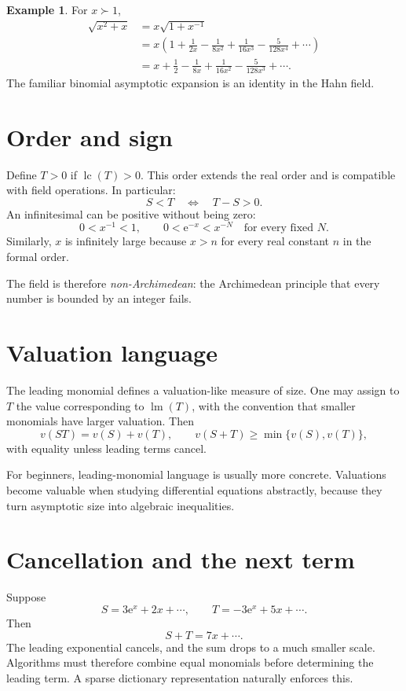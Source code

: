 \documentclass[11pt,openany]{book}
\theoremstyle{definition}
\newtheorem{example}{Example}[chapter]
\theoremstyle{plain}
\theoremstyle{remark}
\newcommand{\e}{\mathrm{e}}
\newcommand{\succdom}{\succ}
\DeclareMathOperator{\lm}{lm}
\DeclareMathOperator{\lc}{lc}
\begin{document}
\begin{example}
For $x\succdom1$,
\begin{align*}
 \sqrt{x^2+x}
 &=x\sqrt{1+x^{-1}}\\
 &=x\left(1+\frac1{2x}-\frac1{8x^2}
 +\frac1{16x^3}-\frac5{128x^4}+\cdots\right)\\
 &=x+\frac12-\frac1{8x}+\frac1{16x^2}
 -\frac5{128x^3}+\cdots.
\end{align*}
The familiar binomial asymptotic expansion is an identity in the Hahn field.
\end{example}

\section{Order and sign}

Define $T>0$ if $\lc(T)>0$. This order extends the real order and is compatible with field operations. In particular:
\[
 S<T\quad\Longleftrightarrow\quad T-S>0.
\]
An infinitesimal can be positive without being zero:
\[
 0<x^{-1}<1,
 \qquad
 0<\e^{-x}<x^{-N}
 \quad\text{for every fixed }N.
\]
Similarly, $x$ is infinitely large because $x>n$ for every real constant $n$ in the formal order.

The field is therefore \emph{non-Archimedean}: the Archimedean principle that every number is bounded by an integer fails.

\section{Valuation language}

The leading monomial defines a valuation-like measure of size. One may assign to $T$ the value corresponding to $\lm(T)$, with the convention that smaller monomials have larger valuation. Then
\[
 v(ST)=v(S)+v(T),
 \qquad
 v(S+T)\ge\min\{v(S),v(T)\},
\]
with equality unless leading terms cancel.

For beginners, leading-monomial language is usually more concrete. Valuations become valuable when studying differential equations abstractly, because they turn asymptotic size into algebraic inequalities.

\section{Cancellation and the next term}

Suppose
\[
 S=3\e^x+2x+\cdots,
 \qquad
 T=-3\e^x+5x+\cdots.
\]
Then
\[
 S+T=7x+\cdots.
\]
The leading exponential cancels, and the sum drops to a much smaller scale. Algorithms must therefore combine equal monomials before determining the leading term. A sparse dictionary representation naturally enforces this.
\end{document}
